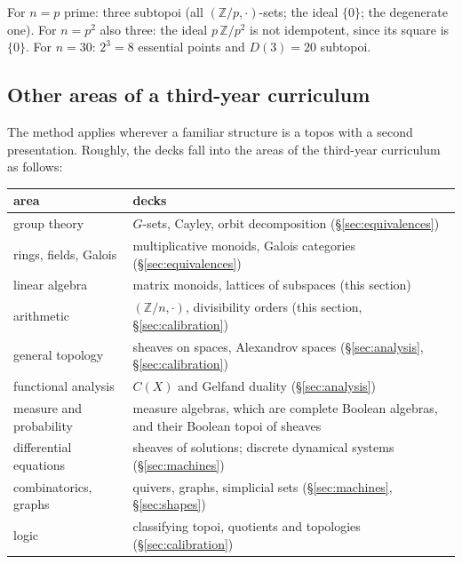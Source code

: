\begin{example}
For $n = p$ prime: three subtopoi (all $(\mathbb Z/p,\cdot)$-sets; the ideal $\{0\}$; the degenerate one). For $n = p^2$ also three: the ideal $p\,\mathbb Z/p^2$ is not idempotent, since its square is $\{0\}$. For $n = 30$: $2^3 = 8$ essential points and $D(3) = 20$ subtopoi.
\end{example}

\subsection{Other areas of a third-year curriculum}

The method applies wherever a familiar structure is a topos with a second presentation. Roughly, the decks fall into the areas of the third-year curriculum as follows:

\begin{center}\small
\begin{tabularx}{\linewidth}{>{\raggedright\arraybackslash}p{3.6cm}>{\raggedright\arraybackslash}X}
\toprule
area & decks\\
\midrule
group theory & $G$-sets, Cayley, orbit decomposition (\S\ref{sec:equivalences})\\
rings, fields, Galois & multiplicative monoids, Galois categories (\S\ref{sec:equivalences})\\
linear algebra & matrix monoids, lattices of subspaces (this section)\\
arithmetic & $(\mathbb Z/n,\cdot)$, divisibility orders (this section, \S\ref{sec:calibration})\\
general topology & sheaves on spaces, Alexandrov spaces (\S\ref{sec:analysis}, \S\ref{sec:calibration})\\
functional analysis & $C(X)$ and Gelfand duality (\S\ref{sec:analysis})\\
measure and probability & measure algebras, which are complete Boolean algebras, and their Boolean topoi of sheaves\\
differential equations & sheaves of solutions; discrete dynamical systems (\S\ref{sec:machines})\\
combinatorics, graphs & quivers, graphs, simplicial sets (\S\ref{sec:machines}, \S\ref{sec:shapes})\\
logic & classifying topoi, quotients and topologies (\S\ref{sec:calibration})\\
\bottomrule
\end{tabularx}
\end{center}
